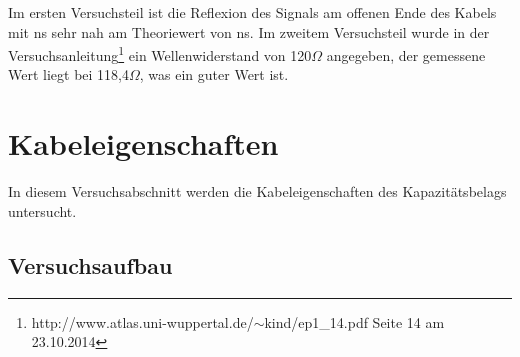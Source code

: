 \documentclass[12pt,a4paper]{article}
\begin{document}
Im ersten Versuchsteil ist die Reflexion des Signals am offenen Ende des Kabels mit \unit[296]{ns} sehr nah am Theoriewert von \unit[300]{ns}. Im zweitem Versuchsteil wurde in der Versuchsanleitung\footnote{http://www.atlas.uni-wuppertal.de/$\sim$kind/ep1\_14.pdf Seite 14 am 23.10.2014} ein Wellenwiderstand von 120$\Omega$ angegeben, der gemessene Wert liegt bei 118,4$\Omega$, was ein guter Wert ist.


\section{Kabeleigenschaften}

In diesem Versuchsabschnitt werden die Kabeleigenschaften des Kapazitätsbelags untersucht.

\subsection{Versuchsaufbau}
\end{document}
